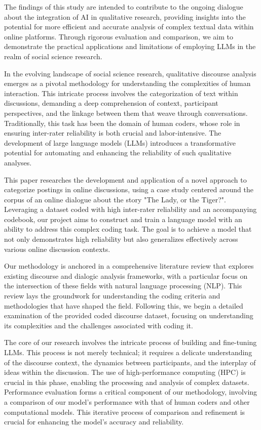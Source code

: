 \documentclass[fleqn,moreauthors,10pt]{ds_report}
\begin{document}
The findings of this study are intended to contribute to the ongoing dialogue about the integration of AI in qualitative research, providing insights into the potential for more efficient and accurate analysis of complex textual data within online platforms. Through rigorous evaluation and comparison, we aim to demonstrate the practical applications and limitations of employing LLMs in the realm of social science research.

\iffalse
In the evolving landscape of social science research, qualitative discourse analysis emerges as a pivotal methodology for understanding the complexities of human interaction. This intricate process involves the categorization of text within discussions, demanding a deep comprehension of context, participant perspectives, and the linkage between them that weave through conversations. Traditionally, this task has been the domain of human coders, whose role in ensuring inter-rater reliability is both crucial and labor-intensive. The development of large language models (LLMs) introduces a transformative potential for automating and enhancing the reliability of such qualitative analyses.

This paper researches the development and application of a novel approach to categorize postings in online discussions, using a case study centered around the corpus of an online dialogue about the story "The Lady, or the Tiger?". Leveraging a dataset coded with high inter-rater reliability and an accompanying codebook, our project aims to construct and train a language model with an ability to address this complex coding task. The goal is to achieve a model that not only demonstrates high reliability but also generalizes effectively across various online discussion contexts.

Our methodology is anchored in a comprehensive literature review that explores existing discourse and dialogic analysis frameworks, with a particular focus on the intersection of these fields with natural language processing (NLP). This review lays the groundwork for understanding the coding criteria and methodologies that have shaped the field. Following this, we begin a detailed examination of the provided coded discourse dataset, focusing on understanding its complexities and the challenges associated with coding it.

The core of our research involves the intricate process of building and fine-tuning LLMs. This process is not merely technical; it requires a delicate understanding of the discourse context, the dynamics between participants, and the interplay of ideas within the discussion. The use of high-performance computing (HPC) is crucial in this phase, enabling the processing and analysis of complex datasets. Performance evaluation forms a critical component of our methodology, involving a comparison of our model's performance with that of human coders and other computational models. This iterative process of comparison and refinement is crucial for enhancing the model's accuracy and reliability.
\end{document}
